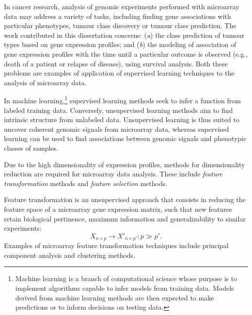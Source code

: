 
In cancer research, analysis of genomic experiments performed with
 microarray data may address a variety of tasks, including
finding gene associations with particular phenotypes, tumour class discovery or
tumour class prediction.  The work contributed in this dissertation concerns:
(\emph{a}) the class prediction of tumour types based on gene expression
profiles; and (\emph{b}) the modeling of association of gene expression profiles
with the time until a particular outcome is observed (e.g., death of a patient
or relapse of disease), using survival analysis.  Both these problems are
examples of application of supervised learning techniques to the analysis of
microarray data.

In machine learning,\footnote{Machine learning is a branch of computational
  science whose purpose is to implement algorithms capable to infer models from
  training data.  Models derived from machine learning methods are then expected
  to make predictions or to inform decisions on testing data.} supervised
learning methods seek to infer a function from labeled training data.
Conversely, unsupervised learning methods aim to find intrinsic structure from
unlabeled data.\cite{webb_statistical_2003} Unsupervised learning is thus suited
to uncover coherent genomic signals from microarray data, whereas supervised
learning can be used to find associations between genomic signals and phenotypic
classes of samples.

Due to the high dimensionality of expression profiles, methods for
dimensionality reduction are required for microarray data analysis.  These
include \emph{feature transformation} methods and \emph{feature selection}
methods.\cite{haibe-kains_identification_2009}

Feature transformation is an unsupervised approach that consists in reducing the
feature space of a microarray gene expression matrix, such that new features
retain biological pertinence, maximum information and generalizability to
similar experiments:
\begin{equation}
  \label{eq:feature-transformation}
  X_{n \times p} \to X'_{n \times p'} : p \gg p'.
\end{equation}
Examples of microarray feature transformation techniques include principal
component analysis and clustering methods.

